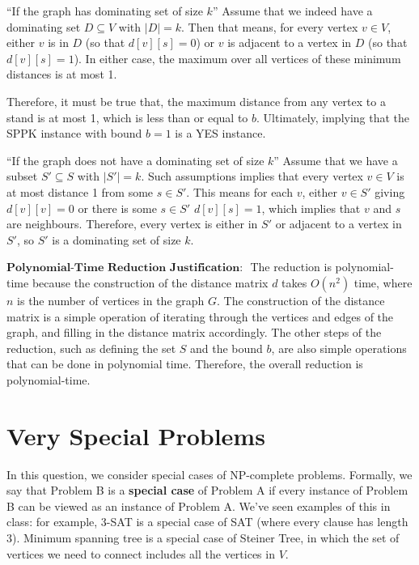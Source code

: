 \documentclass[11pt,fleqn]{exam}
\newenvironment{soln}{\color{solnblue}}{}
\newif\ifsolutions\solutionsfalse
\begin{document}
\begin{questions}
\begin{soln}
\begin{enumerate}
            ``If the graph has dominating set of size $k$''
            Assume that we indeed have a dominating set $D \subseteq V$ with 
            $|D| = k$. Then that means, for every vertex $v \in V$, 
            either $v$ is in $D$ (so that $d[v][s] = 0$) or 
            $v$ is adjacent to a vertex in $D$ (so that $d[v][s] = 1$).
            In either case, the maximum over all vertices of these minimum distances
            is at most 1. 

            Therefore, it must be true that, the maximum distance from any vertex
            to a stand is at most 1, which is less than or equal to $b$. Ultimately,
            implying that the SPPK instance with bound $b = 1$ is a YES instance.

            ``If the graph does not have a dominating set of size $k$''
            Assume that we have a subset $S\prime \subseteq S$ with $|S\prime| = k$.
            Such assumptions implies that every vertex $v \in V$ is at most 
            distance 1 from some $s \in S\prime$. This means for each $v$, either
            $v \in S\prime$ giving $d[v][v] = 0$ or there is some $s \in S\prime$
            $d[v][s] = 1$, which implies that $v$ and $s$ are neighbours.
            Therefore, every vertex is either in $S\prime$ or adjacent to a vertex
            in $S\prime$, so $S\prime$ is a dominating set of size $k$.
      \end{enumerate}
      $\textbf{Polynomial-Time Reduction Justification: }$
      The reduction is polynomial-time because the construction of the distance matrix
      $d$ takes $O(n^2)$ time, where $n$ is the number of vertices in the graph $G$.
      The construction of the distance matrix is a simple operation of
      iterating through the vertices and edges of the graph, and filling in the
      distance matrix accordingly. The other steps of the reduction, such as
      defining the set $S$ and the bound $b$, are also simple operations that
      can be done in polynomial time. Therefore, the overall reduction is polynomial-time.
\end{soln}
 
  \ifsolutions\fi
  \end{questions}


\section{Very Special Problems}

In this question, we consider special cases of NP-complete problems. Formally, we say that Problem B is a \textbf{special case} of Problem A if every instance of Problem B can be viewed as an instance of Problem A. We've seen examples of this in class: for example, 3-SAT is a special case of SAT (where every clause has length 3). Minimum spanning tree is a special case of Steiner Tree, in which the set of vertices we need to connect includes all the vertices in $V$.
\end{document}
